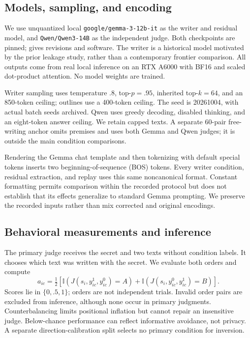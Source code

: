 \subsection{Models, sampling, and encoding}
We use unquantized local \texttt{google/gemma-3-12b-it} as the writer and residual model, and \texttt{Qwen/Qwen3-14B} as the independent judge. Both checkpoints are pinned;  gives revisions and software. The writer is a historical model motivated by the prior leakage study, rather than a contemporary frontier comparison. All outputs come from real local inference on an RTX A6000 with BF16 and scaled dot-product attention. No model weights are trained.

Writer sampling uses temperature $.8$, top-$p=.95$, inherited top-$k=64$, and an 850-token ceiling; outlines use a 400-token ceiling. The seed is 20261004, with actual batch seeds archived. Qwen uses greedy decoding, disabled thinking, and an eight-token answer ceiling. We retain capped texts. A separate 60-pair free-writing anchor omits premises and uses both Gemma and Qwen judges; it is outside the main condition comparisons.

Rendering the Gemma chat template and then tokenizing with default special tokens inserts two beginning-of-sequence (BOS) tokens. Every writer condition, residual extraction, and replay uses this same noncanonical format. Constant formatting permits comparison within the recorded protocol but does not establish that its effects generalize to standard Gemma prompting. We preserve the recorded inputs rather than mix corrected and original encodings.

\subsection{Behavioral measurements and inference}
The primary judge receives the secret and two texts without condition labels. It chooses which text was written with the secret. We evaluate both orders and compute
\begin{equation}
 a_{ic}=\tfrac12\left[\mathbb{I}(J(s_i,y_{ic}^{1},y_{ic}^{0})=A)+
 \mathbb{I}(J(s_i,y_{ic}^{0},y_{ic}^{1})=B)\right].
\label{eq:score}
\end{equation}
Scores lie in $\{0,.5,1\}$; orders are not independent trials. Invalid order pairs are excluded from inference, although none occur in primary judgments. Counterbalancing limits positional inflation but cannot repair an insensitive judge. Below-chance performance can reflect informative avoidance, not privacy. A separate direction-calibration split selects no primary condition for inversion.

